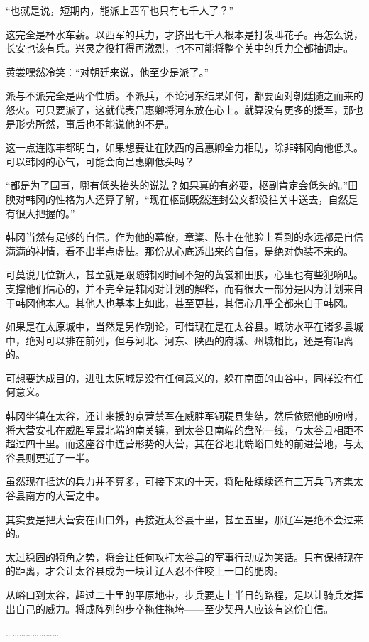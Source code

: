 “也就是说，短期内，能派上西军也只有七千人了？”

这完全是杯水车薪。以西军的兵力，才挤出七千人根本是打发叫花子。再怎么说，长安也该有兵。兴灵之役打得再激烈，也不可能将整个关中的兵力全都抽调走。

黄裳嘿然冷笑：“对朝廷来说，他至少是派了。”

派与不派完全是两个性质。不派兵，不论河东结果如何，都要面对朝廷随之而来的怒火。可只要派了，这就代表吕惠卿将河东放在心上。就算没有更多的援军，那也是形势所然，事后也不能说他的不是。

这一点连陈丰都明白，如果想要让在陕西的吕惠卿全力相助，除非韩冈向他低头。可以韩冈的心气，可能会向吕惠卿低头吗？

“都是为了国事，哪有低头抬头的说法？如果真的有必要，枢副肯定会低头的。”田腴对韩冈的性格为人还算了解，“现在枢副既然连封公文都没往关中送去，自然是有很大把握的。”

韩冈当然有足够的自信。作为他的幕僚，章楶、陈丰在他脸上看到的永远都是自信满满的神情，看不出半点虚怯。那份从心底透出来的自信，是绝对伪装不来的。

可莫说几位新人，甚至就是跟随韩冈时间不短的黄裳和田腴，心里也有些犯嘀咕。支撑他们信心的，并不完全是韩冈对计划的解释，而有很大一部分是因为计划来自于韩冈他本人。其他人也基本上如此，甚至更甚，其信心几乎全都来自于韩冈。

如果是在太原城中，当然是另作别论，可惜现在是在太谷县。城防水平在诸多县城中，绝对可以排在前列，但与河北、河东、陕西的府城、州城相比，还是有距离的。

可想要达成目的，进驻太原城是没有任何意义的，躲在南面的山谷中，同样没有任何意义。

韩冈坐镇在太谷，还让来援的京营禁军在威胜军铜鞮县集结，然后依照他的吩咐，将大营安扎在威胜军最北端的南关镇，到太谷县南端的盘陀一线，与太谷县相距不超过四十里。而这座谷中连营形势的大营，其在谷地北端峪口处的前进营地，与太谷县则更近了一半。

虽然现在抵达的兵力并不算多，可接下来的十天，将陆陆续续还有三万兵马齐集太谷县南方的大营之中。

其实要是把大营安在山口外，再接近太谷县十里，甚至五里，那辽军是绝不会过来的。

太过稳固的犄角之势，将会让任何攻打太谷县的军事行动成为笑话。只有保持现在的距离，才会让太谷县成为一块让辽人忍不住咬上一口的肥肉。

从峪口到太谷，超过二十里的平原地带，步兵要走上半日的路程，足以让骑兵发挥出自己的威力。将成阵列的步卒拖住拖垮——至少契丹人应该有这份自信。

……………………

